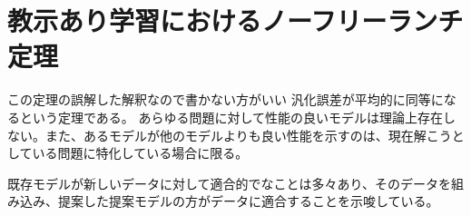 \begin{comment}
\section{みにくいアヒルの子の定理}
恣意的に特徴量を選ばなければ、ある共通点をもつ２つの物に関して、類似した特徴の個数と類似しない特徴の個数は、同数になることを示唆する。

適当に取ってきた特徴によって二つの物を区別しようとすると、区別できることが多々あり、特徴をあげれるだけあげてその中から1つ選んだとすれば、$50\%$くらいは二つのことがらを区別できる特徴である。
次のような実験を計画する。まず、二つの事柄に関してあげれるだけ特徴をあげ、一つずつ特徴を取って調べて、異なっているとみなせるかを判断する。異なるといえそうなものが見つかったら、実験計画を練って、再び実験を行い、その特徴に関する仮説がすでにあったかのようにして報告を行う。
いつかは分類可能な特徴を得られるはずなので、やめておいた方が良い。研究目的を立てて、特徴となるデータを取っていくことが通常の研究方法である。

恣意的に選ばなくても、異なると判断できる特徴が見つけることができることを示唆している。
また、我々が分類を行うさいに、恣意的に特徴を選んで物を区別していることを示唆している。
\end{comment}


\section{教示あり学習におけるノーフリーランチ定理}
この定理の誤解した解釈なので書かない方がいい
汎化誤差が平均的に同等になるという定理である。
あらゆる問題に対して性能の良いモデルは理論上存在しない。また、あるモデルが他のモデルよりも良い性能を示すのは、現在解こうとしている問題に特化している場合に限る。

既存モデルが新しいデータに対して適合的でなことは多々あり、そのデータを組み込み、提案した提案モデルの方がデータに適合することを示唆している。

\fi


